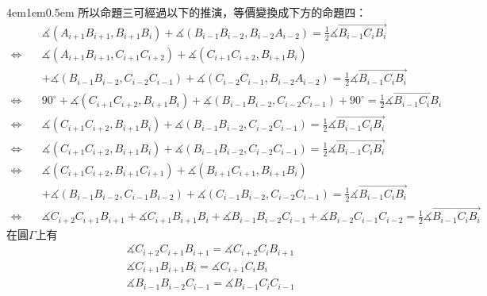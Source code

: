 \documentclass[12pt]{article}
\begin{document}
{\begin{mybox}[證明]{4em}{1em}{0.5em}
    所以命題三可經過以下的推演，等價變換成下方的命題四：
    \begin{align*}
        &\measuredangle{\left(A_{i+1}B_{i+1}, B_{i+1}B_i\right)}+\measuredangle{\left(B_{i-1}B_{i-2},B_{i-2}A_{i-2}\right)}
        =\frac{1}{2}\measuredangle{\overrightarrow{B_{i-1}C_iB_i}}\\
        \Leftrightarrow\quad&\measuredangle{\left(A_{i+1}B_{i+1}, C_{i+1}C_{i+2}\right)}+\measuredangle{\left(C_{i+1}C_{i+2}, B_{i+1}B_i\right)}\\
        &+\measuredangle{\left(B_{i-1}B_{i-2},C_{i-2}C_{i-1}\right)}+\measuredangle{\left(C_{i-2}C_{i-1},B_{i-2}A_{i-2}\right)}
        =\frac{1}{2}\measuredangle{\overrightarrow{B_{i-1}C_iB_i}}\\
        \Leftrightarrow\quad&90^{\circ}+\measuredangle{\left(C_{i+1}C_{i+2}, B_{i+1}B_i\right)}+\measuredangle{\left(B_{i-1}B_{i-2},C_{i-2}C_{i-1}\right)}+90^{\circ}
        =\frac{1}{2}\measuredangle{\overrightarrow{B_{i-1}C_iB_i}}\\
        \Leftrightarrow\quad&\measuredangle{\left(C_{i+1}C_{i+2}, B_{i+1}B_i\right)}+\measuredangle{\left(B_{i-1}B_{i-2},C_{i-2}C_{i-1}\right)}
        =\frac{1}{2}\measuredangle{\overrightarrow{B_{i-1}C_iB_i}}\\
        \Leftrightarrow\quad&\measuredangle{\left(C_{i+1}C_{i+2}, B_{i+1}B_i\right)}+\measuredangle{\left(B_{i-1}B_{i-2},C_{i-2}C_{i-1}\right)}
        =\frac{1}{2}\measuredangle{\overrightarrow{B_{i-1}C_iB_i}}\\
        \Leftrightarrow\quad&\measuredangle{\left(C_{i+1}C_{i+2}, B_{i+1}C_{i+1}\right)}+\measuredangle{\left(B_{i+1}C_{i+1}, B_{i+1}B_i\right)}\\
        &+\measuredangle{\left(B_{i-1}B_{i-2},C_{i-1}B_{i-2}\right)}+\measuredangle{\left(C_{i-1}B_{i-2},C_{i-2}C_{i-1}\right)}
        =\frac{1}{2}\measuredangle{\overrightarrow{B_{i-1}C_iB_i}}\\
        \Leftrightarrow\quad&\measuredangle{C_{i+2}C_{i+1}B_{i+1}}+\measuredangle{C_{i+1}B_{i+1}B_i}+\measuredangle{B_{i-1}B_{i-2}C_{i-1}}+\measuredangle{B_{i-2}C_{i-1}C_{i-2}}
        =\frac{1}{2}\measuredangle{\overrightarrow{B_{i-1}C_iB_i}}
    \end{align*}
    在圓$\Gamma$上有
    \begin{align*}
        &\measuredangle{C_{i+2}C_{i+1}B_{i+1}}=\measuredangle{C_{i+2}C_iB_{i+1}}\\
        &\measuredangle{C_{i+1}B_{i+1}B_i}=\measuredangle{C_{i+1}C_iB_i}\\
        &\measuredangle{B_{i-1}B_{i-2}C_{i-1}}=\measuredangle{B_{i-1}C_iC_{i-1}}\\

\end{align*}
\end{mybox}}
\end{document}
